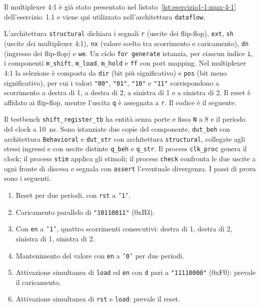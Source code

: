 
Il multiplexer 4:1 è già stato presentato nel listato~\ref{lst:esercizio1-1:mux-4-1} dell'esercizio~1.1 e viene qui utilizzato nell'architettura \texttt{dataflow}.

L'architettura \texttt{structural} dichiara i segnali \texttt{r} (uscite dei flip-flop), \texttt{ext}, \texttt{sh} (uscite dei multiplexer 4:1), \texttt{nx} (valore scelto tra scorrimento e caricamento), \texttt{dn} (ingresso dei flip-flop) e \texttt{we}. Un ciclo \texttt{for generate} istanzia, per ciascun indice \texttt{i}, i componenti \texttt{m\_shift}, \texttt{m\_load}, \texttt{m\_hold} e \texttt{ff} con port mapping. Nel multiplexer 4:1 la selezione è composta da \texttt{dir} (bit più significativo) e \texttt{pos} (bit meno significativo), per cui i valori \texttt{"00"}, \texttt{"01"}, \texttt{"10"} e \texttt{"11"} corrispondono a scorrimento a destra di 1, a destra di 2, a sinistra di 1 e a sinistra di 2. Il reset è affidato ai flip-flop, mentre l'uscita \texttt{q} è assegnata a \texttt{r}. Il codice è il seguente.


\simulazione

Il testbench \texttt{shift\_register\_tb} ha entità senza porte e fissa \texttt{N} a 8 e il periodo del clock a \SI{10}{ns}. Sono istanziate due copie del componente, \texttt{dut\_beh} con architettura \texttt{Behavioral} e \texttt{dut\_str} con architettura \texttt{structural}, collegate agli stessi ingressi e con uscite distinte \texttt{q\_beh} e \texttt{q\_str}. Il process \texttt{clk\_proc} genera il clock; il process \texttt{stim} applica gli stimoli; il process \texttt{check} confronta le due uscite a ogni fronte di discesa e segnala con \texttt{assert} l'eventuale divergenza. I passi di prova sono i seguenti.

\begin{enumerate}
  \item Reset per due periodi, con \texttt{rst} a \texttt{'1'}.
  \item Caricamento parallelo di \texttt{"10110011"} (0xB3).
  \item Con \texttt{en} a \texttt{'1'}, quattro scorrimenti consecutivi: destra di 1, destra di 2, sinistra di 1, sinistra di 2.
  \item Mantenimento del valore con \texttt{en} a \texttt{'0'} per due periodi.
  \item Attivazione simultanea di \texttt{load} ed \texttt{en} con \texttt{d} pari a \texttt{"11110000"} (0xF0): prevale il caricamento.
  \item Attivazione simultanea di \texttt{rst} e \texttt{load}: prevale il reset.
\end{enumerate}

